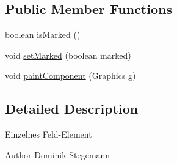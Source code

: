 \subsection*{Public Member Functions}
\begin{DoxyCompactItemize}
\item 
boolean \hyperlink{classde_1_1gameoflife_1_1gui_1_1FieldPanelElement_a45addc91a66daef330b7b8ce2d2862a2}{is\-Marked} ()
\item 
void \hyperlink{classde_1_1gameoflife_1_1gui_1_1FieldPanelElement_a886edb9721a0052141bc12cbec4edbce}{set\-Marked} (boolean marked)
\item 
void \hyperlink{classde_1_1gameoflife_1_1gui_1_1FieldPanelElement_a48207231c396de7095bc8bb4063609d6}{paint\-Component} (Graphics g)
\end{DoxyCompactItemize}


\subsection{Detailed Description}
Einzelnes Feld-\/\-Element \begin{DoxyAuthor}{Author}
Dominik Stegemann 
\end{DoxyAuthor}


